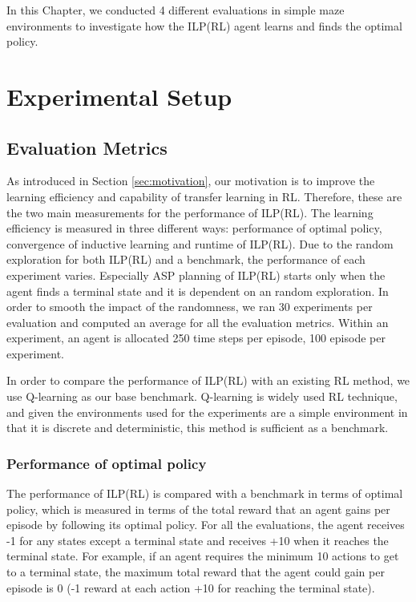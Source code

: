 In this Chapter, we conducted 4 different evaluations in simple maze environments to investigate how the ILP(RL) agent learns and finds the optimal policy.

\section{Experimental Setup}
\label{sec:experimental_setup}

\subsection{Evaluation Metrics}
\label{subsec:evaluation_metrics}

As introduced in Section \ref{sec:motivation}, our motivation is to improve the learning efficiency and capability of transfer learning in RL.
Therefore, these are the two main measurements for the performance of ILP(RL).
The learning efficiency is measured in three different ways: performance of optimal policy, convergence of inductive learning and runtime of ILP(RL). Due to the random exploration for both ILP(RL) and a benchmark, the performance of each experiment varies. Especially ASP planning of ILP(RL) starts only when the agent finds a terminal state and it is dependent on an random exploration. In order to smooth the impact of the randomness, we ran 30 experiments per evaluation and computed an average for all the evaluation metrics. Within an experiment, an agent is allocated 250 time steps per episode, 100 episode per experiment.

In order to compare the performance of ILP(RL) with an existing RL method, we use Q-learning as our base benchmark.
Q-learning is widely used RL technique, and given the environments used for the experiments are a simple environment in that
it is discrete and deterministic, this method is sufficient as a benchmark.


\subsubsection{Performance of optimal policy}
The performance of ILP(RL) is compared with a benchmark in terms of
 optimal policy, which is measured in terms of the total reward that an agent gains per episode by following its optimal policy.
For all the evaluations, the agent receives -1 for any states except a terminal state and receives +10 when it reaches the terminal state.
For example, if an agent requires the minimum 10 actions to get to a terminal state, the maximum total reward that the agent could gain per episode is 0 (-1 reward at each action +10 for reaching the terminal state).

